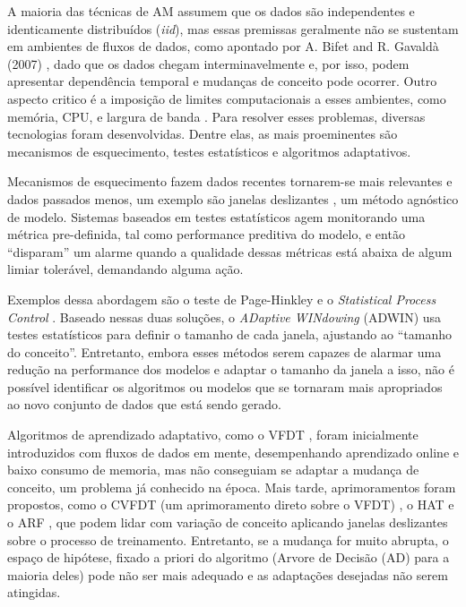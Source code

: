 A maioria das técnicas de AM assumem que os dados são independentes e
identicamente distribuídos (\textit{iid}), mas essas premissas geralmente não
se sustentam em ambientes de fluxos de dados, como apontado por A. Bifet and R.
Gavald\`a (2007) \cite{bifet2007learning}, dado que os dados chegam
interminavelmente e, por isso, podem apresentar dependência temporal e mudanças
de conceito pode ocorrer.  Outro aspecto critico é a imposição de limites
computacionais a esses ambientes, como memória, CPU, e largura de banda
\cite{bifet2010moa, gama2012survey}.  Para resolver esses problemas, diversas
tecnologias foram desenvolvidas. Dentre elas, as mais proeminentes são
mecanismos de esquecimento, testes estatísticos e algoritmos adaptativos.

Mecanismos de esquecimento fazem dados recentes tornarem-se mais relevantes e
dados passados menos, um exemplo são janelas deslizantes
\cite{gaber2005mining}, um método agnóstico de modelo.
Sistemas baseados em testes estatísticos agem monitorando uma métrica
pre-definida, tal como performance preditiva do modelo, e então ``disparam'' um
alarme quando a qualidade dessas métricas está abaixa de algum limiar
tolerável, demandando alguma ação.

Exemplos dessa abordagem são o teste de Page-Hinkley e o \textit{Statistical
Process Control} \cite{gama2010knowledge}.
Baseado nessas duas soluções, o \textit{ADaptive WINdowing} (ADWIN) \cite{bifet2007learning} usa testes estatísticos para definir o tamanho de cada janela, ajustando ao ``tamanho do conceito''.
Entretanto, embora esses métodos serem capazes de alarmar uma redução na performance dos modelos e adaptar o tamanho da janela a isso, não é possível identificar os algoritmos ou modelos que se tornaram mais apropriados ao novo conjunto de dados que está sendo gerado.

Algoritmos de aprendizado adaptativo, como o VFDT \cite{domingos2000mining},
foram inicialmente introduzidos com fluxos de dados em mente, desempenhando aprendizado online e baixo consumo de memoria, mas não conseguiam se adaptar a mudança de conceito, um problema já conhecido na época.
Mais tarde, aprimoramentos foram propostos, como o CVFDT (um aprimoramento direto sobre o VFDT) \cite{hulten2001mining}, o HAT \cite{bifet2009adaptive} e o ARF \cite{gomes2017adaptive}, que podem lidar com variação de conceito aplicando janelas deslizantes sobre o processo de treinamento.
Entretanto, se a mudança for muito abrupta, o espaço de hipótese, fixado a priori do algoritmo (Arvore de Decisão (AD) para a maioria deles) pode não ser mais adequado e as adaptações desejadas não serem atingidas.

